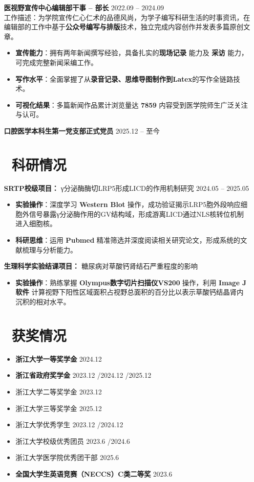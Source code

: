 \documentclass[11pt]{article}
\newlength{\interProjectSpacing}
\newcommand{\projectsep}{\vspace{\interProjectSpacing}}
\newlength{\intraProjectTitleSep}
\newcommand{\titlebreak}{\\[\intraProjectTitleSep]}
\newlength{\intraProjectListTopSep}
\begin{document}
\textbf{医视野宣传中心编辑部干事 -- 部长} \hfill 2022.09 -- 2024.09 \titlebreak
工作描述：为学院宣传仁心仁术的品德风尚，为学子编写科研生活的时事资讯，在编辑部的工作中基于\textbf{公众号编写与排版}技术，独立完成内容创作并发表多篇原创文章。
\begin{itemize}[nosep, topsep=\intraProjectListTopSep]
    \item \textbf{宣传能力}：拥有两年新闻撰写经验，具备扎实的\textbf{现场记录} 能力及 \textbf{采访} 能力，可完成完整新闻采编工作。
    \item \textbf{写作水平}：全面掌握了从\textbf{录音记录、思维导图制作到Latex}的写作全链路技术。
    \item \textbf{可视化结果}：多篇新闻作品累计浏览量达 \textbf{7859} 内容受到医学院师生广泛关注与认可。
\end{itemize}

\textbf{口腔医学本科生第一党支部正式党员} \hfill 2025.12 -- 至今

\section{{\color{CVBlue}\faCogs}\ 科研情况}
\textbf{SRTP校级项目：} γ分泌酶酶切LRP5形成LICD的作用机制研究 \hfill 2024.05 -- 2025.05
\begin{itemize}[nosep, topsep=\intraProjectListTopSep]
    \item \textbf{实验操作}：深度学习 \textbf{Western Blot} 操作，成功验证揭示LRP5胞外段响应细胞外信号暴露γ分泌酶作用的GV结构域，形成游离LICD通过NLS核转位机制进入细胞核。
     \item \textbf{科研思维}：运用 \textbf{Pubmed} 精准筛选并深度阅读相关研究论文，形成系统的文献梳理与分析能力。
\end{itemize}
\projectsep
\textbf{生理科学实验结课项目：} 糖尿病对草酸钙肾结石严重程度的影响
\begin{itemize}[nosep, topsep=\intraProjectListTopSep]
    \item \textbf{实验操作}：熟练掌握 \textbf{Olympus数字切片扫描仪VS200} 操作，利用 \textbf{Image J软件} 计算视野下阳性区域面积占视野总面积的百分比以表示草酸钙结晶肾内沉积的相对水平。
\end{itemize}

\section{{\color{CVBlue}\faList}\ 获奖情况} 
\begin{itemize}[nosep]
    \item \textbf{浙江大学一等奖学金} \hfill 2024.12
    \item \textbf{浙江省政府奖学金} \hfill 2023.12 /2024.12 /2025.12
    \item 浙江大学二等奖学金 \hfill 2023.12
    \item 浙江大学三等奖学金 \hfill 2025.12
    \item 浙江大学优秀学生 \hfill 2023.12 /2024.12
    \item 浙江大学校级优秀团员 \hfill 2023.6 /2024.6
    \item 浙江大学医学院优秀团干部 \hfill 2025.6
    \item \textbf{全国大学生英语竞赛（NECCS）C类二等奖} \hfill 2023.6
\end{itemize}
\end{document}
